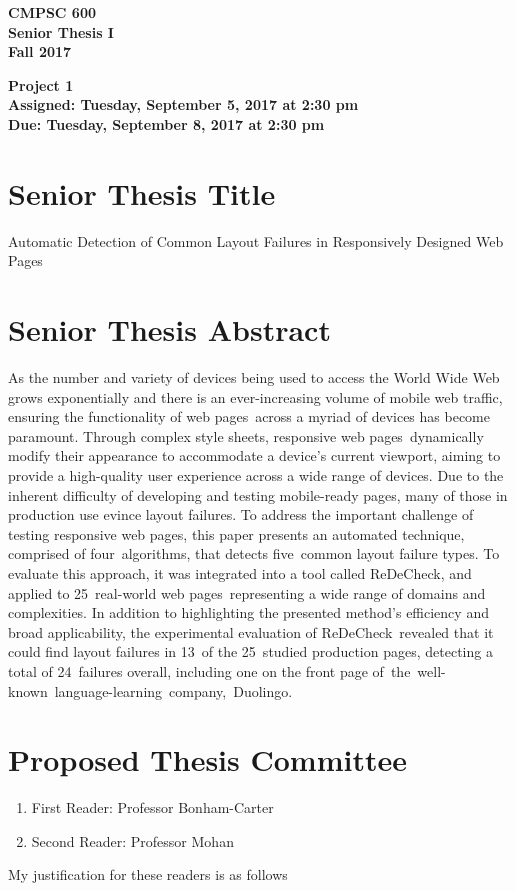 \documentclass[11pt]{article}
\newcommand{\assignmentduedate}{September 8}
\newcommand{\assignmentassignedate}{September 5}
\newcommand{\labyear}{2017}
\newcommand{\labday}{Tuesday}
\newcommand{\labtime}{2:30 pm}
\newcommand{\assigneddate}{Assigned: \labday, \assignmentassignedate, \labyear{} at \labtime{}}
\newcommand{\duedate}{Due: \labday, \assignmentduedate, \labyear{} at \labtime{}}
\newcommand{\projecttitle}[1]
{
  \begin{center}
    \begin{center}
      \bf
      CMPSC 600\\Senior Thesis I\\
      Fall 2017\\
      \medskip
    \end{center}
    \bf
    #1
  \end{center}
}
\newcommand{\webpages}{web pages\xspace}
\newcommand{\stylesheets}{style sheets\xspace}
\newcommand{\numtypes}{five\xspace}
\newcommand{\numalgorithms}{four\xspace}
\newcommand{\numsubjects}{25\xspace}
\newcommand{\totalfailures}{24\xspace}
\newcommand{\numpageswithfailures}{13\xspace}
\newcommand{\redecheck}{{\sc ReDeCheck}\xspace}
\begin{document}
\thispagestyle{empty}

\projecttitle{Project 1 \\ \assigneddate{} \\ \duedate{}}

\section*{Senior Thesis Title}

\noindent
Automatic Detection of Common Layout Failures in Responsively Designed Web Pages

\section*{Senior Thesis Abstract}

As the number and variety of devices being used to access the World Wide Web grows exponentially and there is an
ever-increasing volume of mobile web traffic, ensuring the functionality of \webpages~across a myriad of devices has
become paramount. Through complex \stylesheets, responsive \webpages~dynamically modify their appearance to
accommodate a device's current viewport, aiming to provide a high-quality user experience across a wide range of
devices. Due to the inherent difficulty of developing and testing mobile-ready pages, many of those in production use
evince layout failures. To address the important challenge of testing responsive \webpages, this paper presents an
automated technique, comprised of \numalgorithms~algorithms, that detects \numtypes~common layout failure types. To
evaluate this approach, it was integrated into a tool called \mbox{\redecheck}, and applied to \numsubjects~real-world
\webpages~representing a wide range of domains and complexities. In addition to highlighting the presented method's
efficiency and broad applicability, the experimental evaluation of \redecheck~revealed that it could find layout
failures in \numpageswithfailures~of the \numsubjects~studied production pages, detecting a total of
\totalfailures~failures overall, including one on the front page of~\mbox{the well-known language-learning company,
Duolingo}.

\section*{Proposed Thesis Committee}

\begin{enumerate}
  \item First Reader: Professor Bonham-Carter
  \item Second Reader: Professor Mohan
\end{enumerate}

\noindent
My justification for these readers is as follows
\end{document}
